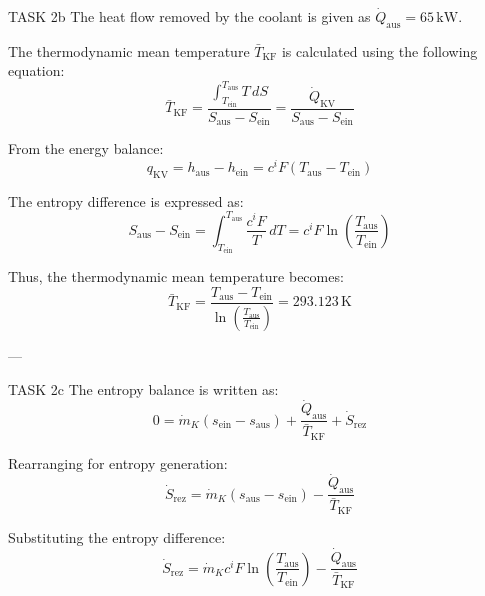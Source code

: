 TASK 2b  
The heat flow removed by the coolant is given as \( \dot{Q}_{\text{aus}} = 65 \, \text{kW} \).  

The thermodynamic mean temperature \( \bar{T}_{\text{KF}} \) is calculated using the following equation:  
\[
\bar{T}_{\text{KF}} = \frac{\int_{T_{\text{ein}}}^{T_{\text{aus}}} T \, dS}{S_{\text{aus}} - S_{\text{ein}}} = \frac{\dot{Q}_{\text{KV}}}{S_{\text{aus}} - S_{\text{ein}}}
\]

From the energy balance:  
\[
q_{\text{KV}} = h_{\text{aus}} - h_{\text{ein}} = c^i F (T_{\text{aus}} - T_{\text{ein}})
\]

The entropy difference is expressed as:  
\[
S_{\text{aus}} - S_{\text{ein}} = \int_{T_{\text{ein}}}^{T_{\text{aus}}} \frac{c^i F}{T} \, dT = c^i F \ln \left( \frac{T_{\text{aus}}}{T_{\text{ein}}} \right)
\]

Thus, the thermodynamic mean temperature becomes:  
\[
\bar{T}_{\text{KF}} = \frac{T_{\text{aus}} - T_{\text{ein}}}{\ln \left( \frac{T_{\text{aus}}}{T_{\text{ein}}} \right)} = 293.123 \, \text{K}
\]

---

TASK 2c  
The entropy balance is written as:  
\[
0 = \dot{m}_K (s_{\text{ein}} - s_{\text{aus}}) + \frac{\dot{Q}_{\text{aus}}}{\bar{T}_{\text{KF}}} + \dot{S}_{\text{rez}}
\]

Rearranging for entropy generation:  
\[
\dot{S}_{\text{rez}} = \dot{m}_K (s_{\text{aus}} - s_{\text{ein}}) - \frac{\dot{Q}_{\text{aus}}}{\bar{T}_{\text{KF}}}
\]

Substituting the entropy difference:  
\[
\dot{S}_{\text{rez}} = \dot{m}_K c^i F \ln \left( \frac{T_{\text{aus}}}{T_{\text{ein}}} \right) - \frac{\dot{Q}_{\text{aus}}}{\bar{T}_{\text{KF}}}
\]